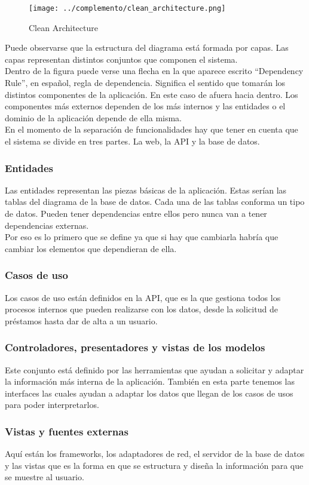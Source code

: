 \begin{figure}[h]
    \texttt{[image: ../complemento/clean\_architecture.png]}
    \caption{Clean Architecture}\label{clean_architecture_diagram}
\end{figure}

Puede observarse que la estructura del diagrama está formada por capas. Las capas representan distintos conjuntos que componen el sistema.
\\Dentro de la figura puede verse una flecha en la que aparece escrito ``Dependency Rule'', en español, regla de dependencia. Significa el sentido que tomarán los distintos componentes de la aplicación. En este caso de afuera hacia dentro. Los componentes más externos dependen de los más internos y las entidades o el dominio de la aplicación depende de ella misma.
\\En el momento de la separación de funcionalidades hay que tener en cuenta que el sistema se divide en tres partes. La web, la API y la base de datos.

\subsubsection{Entidades}
Las entidades representan las piezas básicas de la aplicación. Estas serían las tablas del diagrama de la base de datos. Cada una de las tablas conforma un tipo de datos. Pueden tener dependencias entre ellos pero nunca van a tener dependencias externas.
\\Por eso es lo primero que se define ya que si hay que cambiarla habría que cambiar los elementos que dependieran de ella.

\subsubsection{Casos de uso}
Los casos de uso están definidos en la API, que es la que gestiona todos los procesos internos que pueden realizarse con los datos, desde la solicitud de préstamos hasta dar de alta a un usuario.

\subsubsection{Controladores, presentadores y vistas de los modelos}
Este conjunto está definido por las herramientas que ayudan a solicitar y adaptar la información más interna de la aplicación. También en esta parte tenemos las interfaces las cuales ayudan a adaptar los datos que llegan de los casos de usos para poder interpretarlos.

\subsubsection{Vistas y fuentes externas}
Aquí están los frameworks, los adaptadores de red, el servidor de la base de datos y las vistas que es la forma en que se estructura y diseña la información para que se muestre al usuario.